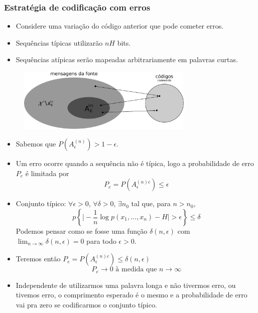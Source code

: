 \begin{frame}[allowframebreaks]
  \frametitle{Estratégia de codificação com erros}
  \begin{itemize}
  \item Considere uma variação do código anterior que pode cometer erros.
  \item Sequências típicas utilizarão $nH$ bits.
  \item Sequências atípicas serão mapeadas arbitrariamente em palavras curtas.
  \end{itemize}

  \begin{figure}[h!]
  \centering
  \includegraphics[width=0.75\textwidth]{images/code-with-error2.pdf}
  \label{fig:code-with-error}
  \end{figure}

  \framebreak

  \begin{itemize}
  \item Sabemos que $P(A_{\epsilon}^{(n)}) > 1 - \epsilon$.
  \item Um erro ocorre quando a sequência não é típica, logo a probabilidade de erro $P_e$ é limitada por
        \begin{equation}
        P_e = P(A_{\epsilon}^{(n)c}) \leq \epsilon
        \end{equation}
  \item Conjunto típico: $\forall \epsilon > 0$, $\forall \delta > 0$, $\exists n_0$ tal que, para $n > n_0$,
        \begin{equation}
        p \left\{ \vert - \frac{1}{n} \log p(x_1, \ldots, x_n) - H \vert > \epsilon \right\} \leq \delta
        \end{equation}
        Podemos pensar como se fosse uma função $\delta(n,\epsilon)$ com $\lim_{n \rightarrow \infty} \delta(n,\epsilon) = 0$ para todo $\epsilon > 0$.
  \item Teremos então $P_e = P(A_{\epsilon}^{(n)c}) \leq \delta(n,\epsilon)$ 
        \begin{equation}
        P_e \rightarrow 0 \text{ à medida que } n \rightarrow \infty
        \end{equation}
  \item Independente de utilizarmos uma palavra longa e não tivermos erro, ou tivemos erro, 
        o comprimento esperado é o mesmo e a probabilidade de erro vai pra zero se codificarmos o conjunto típico.
  \end{itemize}

\end{frame}


